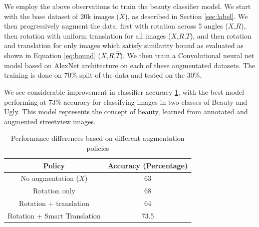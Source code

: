 We employ the above observations to train the beauty classifier model. We start with  the base dataset of 20k images ($X$), as described in Section \ref{sec:label}. We then progressively augment the data: first with rotation across 5 angles ($X$,$R$), then rotation with uniform translation for all images ($X$,$R$,$T$), and then rotation and translation for only images which satisfy similarity bound as evaluated as shown in Equation \ref{eq:bound} ($X$,$R$,$\hat{T}$). 
We then train a Convolutional neural net model based on AlexNet architecture \cite{szegedy2015going} on each of these augmentated datasets. The training is done on 70\% split of the data and tested on the 30\%. 

We see considerable improvement in classifier accuracy \ref{tab:classifier}, with the best model performing at 73\% accuracy for classifying images in two classes of Beauty and Ugly. 
This model represents the concept of beauty, learned from annotated and augmented streetview images. 


\begin{table}[h]
	\centering
	\begin{tabular}{|c|c|}
		\hline
		\textbf{Policy} & \textbf{Accuracy (Percentage)}\\
		\hline
		No augmentation ($X$) & 63 \\
		\hline
		Rotation only & 68 \\
		\hline
		Rotation + translation  & 64 \\
		\hline
		Rotation + Smart Translation & 73.5 \\
		\hline
		
		\hline
	\end{tabular}
	\caption{Performance differences based on different augmentation policies}
	\label{tab:classifier}
    \vspace{-10mm}
\end{table}



